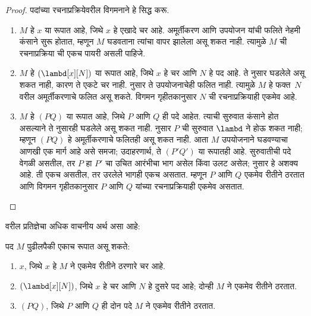 \documentclass[../../../include/open-logic-section]{subfiles}
\begin{document}
\begin{proof}
पदांच्या रचनाप्रक्रियेवरील विगमनाने हे सिद्ध करू.
  \begin{enumerate}
    \item $M$ हे $x$ या रूपात आहे, जिथे $x$ हे
      एखादे चर आहे. अमूर्तीकरण आणि उपयोजन यांची
      फलिते नेहमी कंसाने सुरू होतात, म्हणून $M$
      घडवताना त्यांचा वापर झालेला असू शकत नाही.
      त्यामुळे $M$ ची रचनाप्रक्रिया
      ची एकच पायरी असली पाहिजे.
    \item $M$ हे $(\lambd[x][N])$ या रूपात आहे,
      जिथे $x$ हे चर आणि $N$ हे पद आहे. ते
      नुसार घडलेले असू शकत नाही, कारण ते एकटे
      चर नाही.  नुसार ते
      उपयोजनाचेही फलित नाही. त्यामुळे $M$ हे
      फक्त~$N$ वरील अमूर्तीकरणाचे फलित असू शकते.
      विगमन गृहीतकानुसार $N$ ची रचनाप्रक्रियाही
      एकमेव आहे.
    \item $M$ हे $(PQ)$ या रूपात आहे, जिथे $P$
      आणि $Q$ ही पदे आहेत. त्याची सुरुवात कंसाने
      होत असल्याने ते
      नुसारही घडलेले असू शकत नाही.
       नुसार $P$ ची सुरुवात
      $\lambd$ ने होऊ शकत नाही; म्हणून $(PQ)$ हे
      अमूर्तीकरणाचे फलितही असू शकत नाही. आता $M$
      उपयोजनाने घडवण्याचा आणखी एक मार्ग आहे असे
      समजा; उदाहरणार्थ, ते $(P'Q')$ या रूपातही
      आहे. सुरुवातीची पदे वेगळी असतील, तर $P$
      हा $P'$ चा उचित आरंभीचा भाग असेल किंवा
      उलट असेल;  नुसार हे
      अशक्य आहे. ती एकच असतील, तर उरलेले भागही
      एकच असतात. म्हणून $P$ आणि $Q$ एकमेव
      रीतीने ठरतात आणि विगमन गृहीतकानुसार $P$
      आणि $Q$ यांच्या रचनाप्रक्रियाही एकमेव असतात.
  \end{enumerate}
\end{proof}

वरील प्रतिज्ञेचा अधिक वाचनीय अर्थ असा आहे:
\begin{prop}
  पद $M$ पुढीलपैकी एकाच रूपात असू शकते:
  \begin{enumerate}
    \item $x$, जिथे $x$ हे $M$ ने एकमेव रीतीने
      ठरणारे चर आहे.
    \item $(\lambd[x][N])$, जिथे $x$ हे चर आणि
      $N$ हे दुसरे पद आहे; दोन्ही $M$ ने एकमेव
      रीतीने ठरतात.
    \item $(PQ)$, जिथे $P$ आणि $Q$ ही दोन पदे
      $M$ ने एकमेव रीतीने ठरतात.
  \end{enumerate}
\end{prop}
\end{document}
